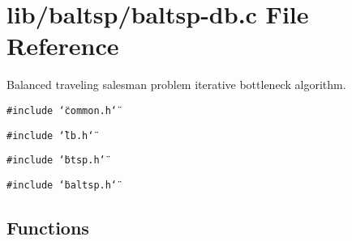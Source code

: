 \hypertarget{lib_2baltsp_2baltsp-db_8c}{
\section{lib/baltsp/baltsp-db.c File Reference}
\label{lib_2baltsp_2baltsp-db_8c}
}
Balanced traveling salesman problem iterative bottleneck algorithm.  


{\tt \#include \char`\"{}common.h\char`\"{}}\par
{\tt \#include \char`\"{}lb.h\char`\"{}}\par
{\tt \#include \char`\"{}btsp.h\char`\"{}}\par
{\tt \#include \char`\"{}baltsp.h\char`\"{}}\par
\subsection*{Functions}
